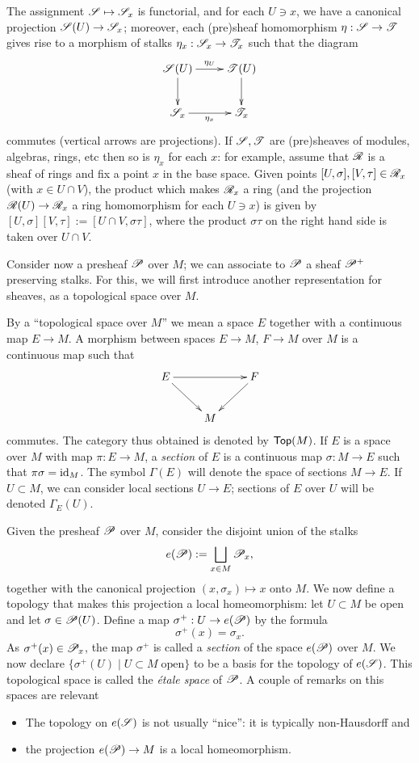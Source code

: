 The assignment $\mathscr{S}\mapsto \mathscr{S}_x$ is functorial, and for each $U\ni x$, we have a canonical projection $\mathscr{S}(U)\to \mathscr{S}_x$; moreover, each (pre)sheaf homomorphism $\eta:\mathscr{S}\to \mathscr{T}$ gives rise to a morphism of stalks $\eta_x:\mathscr{S}_x\to \mathscr{T}_x$ such that the diagram
$$
\xymatrix{\scr{S}(U)\ar[r]^{\eta_U} \ar[d] & \scr{T}(U) \ar[d] \\
\scr{S}_x \ar[r]_{\eta_x} & \scr{T}_x}
$$
commutes (vertical arrows are projections). If $\mathscr{S},\mathscr{T}$ are (pre)sheaves of modules, algebras, rings, etc then so is $\eta_x$ for each $x$: for example, assume that $\mathscr{R}$ is a sheaf of rings and fix a point $x$ in the base space. Given points $[U,\sigma ],[V,\tau ]\in \mathscr{R}_x$ (with $x\in U\cap V$),  the product which makes $\mathscr{R}_x$ a ring (and the projection $\mathscr{R}(U)\to \mathscr{R}_x$ a ring homomorphism for each $U\ni x$) is given by $[U,\sigma ][V,\tau ]:=[U\cap V,\sigma \tau ]$, where the product $\sigma \tau$ on the right hand side is taken over $U\cap V$.

Consider now a presheaf $\mathscr{P}$ over $M$; we can associate to $\mathscr{P}$ a sheaf $\mathscr{P}^+$ preserving stalks. For this, we will first introduce another representation for sheaves, as a topological space over $M$.

By a ``topological space over $M$'' we mean a space $E$ together with a continuous map $E\to M$. A morphism between spaces $E\to M$, $F\to M$ over $M$ is a continuous map such that
$$
\xymatrix{
E \ar[rr] \ar[dr] & & F \ar[dl] \\
& M & }
$$
commutes. The category thus obtained is denoted by $\mathsf{Top}(M)$. If $E$ is a space over $M$ with map $\pi :E\to M$, a \emph{section} of $E$ is a continuous map $\sigma :M\to E$ such that $\pi \sigma =\operatorname{id}_M$. The symbol $\Gamma (E)$ will denote the space of sections $M\to E$. If $U\subset M$, we can consider local sections $U\to E$; sections of $E$ over $U$ will be denoted $\Gamma_E(U)$.

Given the presheaf $\mathscr{P}$ over $M$, consider the disjoint union of the stalks
$$e(\mathscr{P}):=\bigsqcup_{x\in M}\mathscr{P}_x,$$
together with the canonical projection $(x,\sigma_x)\mapsto x$ onto $M$. We now define a topology that makes this projection a local homeomorphism: let $U\subset M$ be open and let $\sigma \in \mathscr{P}(U)$. Define a map $\sigma^+:U\to e(\mathscr{P})$ by the formula
$$\sigma^+(x)=\sigma_x.$$
As $\sigma^+(x)\in \mathscr{P}_x$, the map $\sigma^+$ is called a \emph{section} of the space $e(\mathscr{P})$ over $M$. We now declare $\{\sigma^+(U)\; | \; U\subset M \; \text{open}\}$ to be a basis for the topology of $e(\mathscr{S})$. This topological space is called the \emph{\'etale space} of $\mathscr{P}$. A couple of remarks on this spaces are relevant
\begin{itemize}
\item The topology on $e(\mathscr{S})$ is not usually ``nice'': it is typically non-Hausdorff and
\item the projection $e(\mathscr{P})\to M$ is a local homeomorphism.
\end{itemize}

